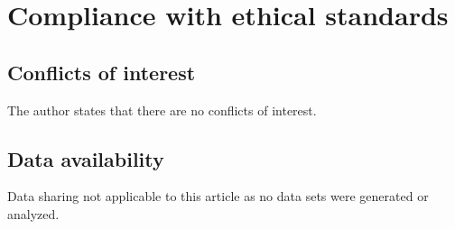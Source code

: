 \documentclass[12pt]{amsart}
\theoremstyle{definition}
\theoremstyle{remark}
\numberwithin{equation}{section}
\begin{document}
\section*{Compliance with ethical standards}
\subsection*{Conflicts of interest}
  The author states that there are no conflicts of interest.


\subsection*{Data availability} Data sharing not applicable to this article as no data sets were generated or analyzed.


\end{document}
